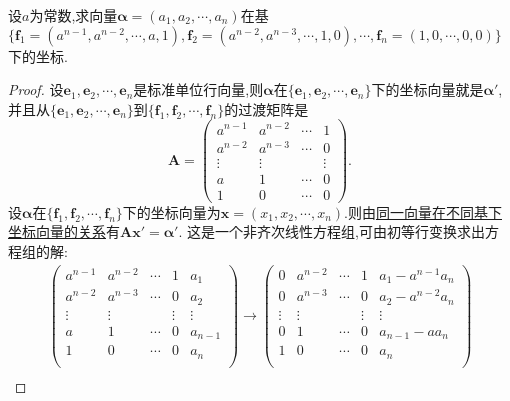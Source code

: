 \documentclass[lang=cn,newtx,10pt,scheme=chinese]{elegantbook}
\begin{document}
\begin{example}
设\(a\)为常数,求向量\(\boldsymbol{\alpha}=(a_1,a_2,\cdots,a_n)\)在基\(\{\boldsymbol{f}_1=(a^{n - 1},a^{n - 2},\cdots,a,1),\boldsymbol{f}_2=(a^{n - 2},a^{n - 3},\cdots,1,0),\cdots,\boldsymbol{f}_n=(1,0,\cdots,0,0)\}\)下的坐标.
\end{example}
\begin{proof}
设\(\boldsymbol{e}_1,\boldsymbol{e}_2,\cdots,\boldsymbol{e}_n\)是标准单位行向量,则\(\boldsymbol{\alpha}\)在\(\{\boldsymbol{e}_1,\boldsymbol{e}_2,\cdots,\boldsymbol{e}_n\}\)下的坐标向量就是$\boldsymbol{\alpha}'$,并且从\(\{\boldsymbol{e}_1,\boldsymbol{e}_2,\cdots,\boldsymbol{e}_n\}\)到\(\{\boldsymbol{f}_1,\boldsymbol{f}_2,\cdots,\boldsymbol{f}_n\}\)的过渡矩阵是
\[
\boldsymbol{A}=\begin{pmatrix}
a^{n - 1}&a^{n - 2}&\cdots&1\\
a^{n - 2}&a^{n - 3}&\cdots&0\\
\vdots&\vdots&&\vdots\\
a&1&\cdots&0\\
1&0&\cdots&0
\end{pmatrix}.
\]
设\(\boldsymbol{\alpha}\)在\(\{\boldsymbol{f}_1,\boldsymbol{f}_2,\cdots,\boldsymbol{f}_n\}\)下的坐标向量为\(\boldsymbol{x}=(x_1,x_2,\cdots,x_n)\).则由\hyperref[theorem:同一向量在不同基下坐标向量的关系]{同一向量在不同基下坐标向量的关系}有\(\boldsymbol{A}\boldsymbol{x}'=\boldsymbol{\alpha}'\). 这是一个非齐次线性方程组,可由初等行变换求出方程组的解:
\begin{gather*}
\left( \begin{matrix}
a^{n-1}&		a^{n-2}&		\cdots&		1&		a_1\\
a^{n-2}&		a^{n-3}&		\cdots&		0&		a_2\\
\vdots&		\vdots&		&		\vdots&		\vdots\\
a&		1&		\cdots&		0&		a_{n-1}\\
1&		0&		\cdots&		0&		a_n\\
\end{matrix} \right) \rightarrow \left( \begin{matrix}
0&		a^{n-2}&		\cdots&		1&		a_1-a^{n-1}a_n\\
0&		a^{n-3}&		\cdots&		0&		a_2-a^{n-2}a_n\\
\vdots&		\vdots&		&		\vdots&		\vdots\\
0&		1&		\cdots&		0&		a_{n-1}-aa_n\\
1&		0&		\cdots&		0&		a_n\\
\end{matrix} \right) 
\\

\end{gather*}
\end{proof}
\end{document}
